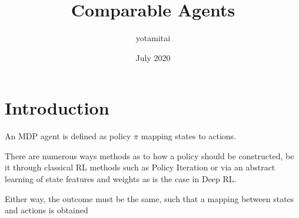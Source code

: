 \documentclass{article}
\title{Comparable Agents}
\author{yotamitai }
\date{July 2020}
\begin{document}
\maketitle

\section{Introduction}
An MDP agent is defined as policy $\pi$ mapping states to actions.

There are numerous ways methods as to how a policy should be constructed, be it
through classical RL methods such as Policy Iteration or via an abstract
learning of state features and weights as is the case in Deep RL.

Either way, the outcome must be the same, such that a mapping between states and actions is
obtained
\end{document}
